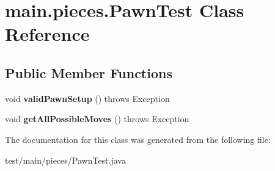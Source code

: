 \hypertarget{classmain_1_1pieces_1_1_pawn_test}{}\section{main.\+pieces.\+Pawn\+Test Class Reference}
\label{classmain_1_1pieces_1_1_pawn_test}
\subsection*{Public Member Functions}
\begin{DoxyCompactItemize}
\item 
\mbox{\label{classmain_1_1pieces_1_1_pawn_test_a47b18156e928ec5e8d6d34fbba73aa53}} 
void {\bfseries valid\+Pawn\+Setup} ()  throws Exception 
\item 
\mbox{\label{classmain_1_1pieces_1_1_pawn_test_abe643a42d57c80cb3c30f20d122babba}} 
void {\bfseries get\+All\+Possible\+Moves} ()  throws Exception 
\end{DoxyCompactItemize}


The documentation for this class was generated from the following file\+:\begin{DoxyCompactItemize}
\item 
test/main/pieces/Pawn\+Test.\+java\end{DoxyCompactItemize}
